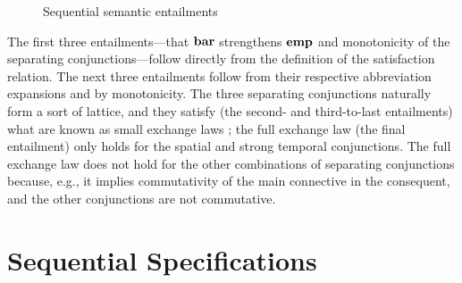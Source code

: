 \documentclass[11pt]{report}         %
\begin{document}
\begin{figure}[ht]
    \centering
    \caption{\label{fig:sequential-entailments}Sequential semantic entailments}
\end{figure}

The first three entailments---that $\mathbf{bar}$ strengthens $\mathbf{emp}$ and monotonicity of the separating conjunctions---follow directly from the definition of the satisfaction relation. The next three entailments follow from their respective abbreviation expansions and by monotonicity. The three separating conjunctions naturally form a sort of lattice, and they satisfy (the second- and third-to-last entailments) what are known as small exchange laws \cite{DBLP:conf/concur/HoareHMOPS11}; the full exchange law (the final entailment) only holds for the spatial and strong temporal conjunctions. The full exchange law does not hold for the other combinations of separating conjunctions because, e.g., it implies commutativity of the main connective in the consequent, and the other conjunctions are not commutative. 


\section{Sequential Specifications}
\label{sec:sequential-specifications}
\end{document}
